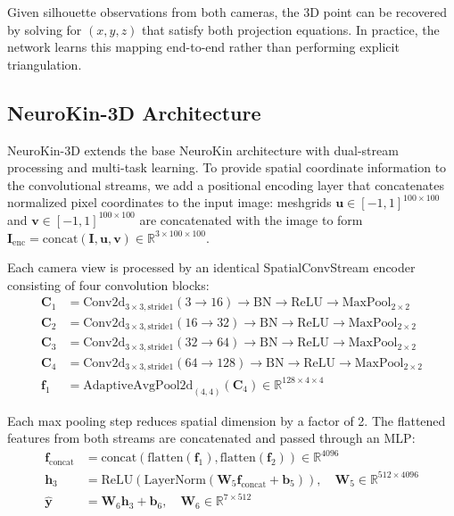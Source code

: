 \documentclass[12pt,a4paper,oneside]{report}
\begin{document}
Given silhouette observations from both cameras, the 3D point can be recovered by solving for $(x, y, z)$ that satisfy both projection equations. In practice, the network learns this mapping end-to-end rather than performing explicit triangulation.
\subsection{NeuroKin-3D Architecture}
\label{subsec:neurokin_3d_architecture}

NeuroKin-3D extends the base NeuroKin architecture with dual-stream processing and multi-task learning. To provide spatial coordinate information to the convolutional streams, we add a positional encoding layer that concatenates normalized pixel coordinates to the input image: meshgrids $\mathbf{u} \in [-1, 1]^{100 \times 100}$ and $\mathbf{v} \in [-1, 1]^{100 \times 100}$ are concatenated with the image to form $\mathbf{I}_{\text{enc}} = \text{concat}(\mathbf{I}, \mathbf{u}, \mathbf{v}) \in \mathbb{R}^{3 \times 100 \times 100}$.

Each camera view is processed by an identical SpatialConvStream encoder consisting of four convolution blocks:
\begin{align}
\mathbf{C}_1 &= \text{Conv2d}_{3\times3,\text{stride}1}(3 \rightarrow 16) \rightarrow \text{BN} \rightarrow \text{ReLU} \rightarrow \text{MaxPool}_{2\times2} \\
\mathbf{C}_2 &= \text{Conv2d}_{3\times3,\text{stride}1}(16 \rightarrow 32) \rightarrow \text{BN} \rightarrow \text{ReLU} \rightarrow \text{MaxPool}_{2\times2} \\
\mathbf{C}_3 &= \text{Conv2d}_{3\times3,\text{stride}1}(32 \rightarrow 64) \rightarrow \text{BN} \rightarrow \text{ReLU} \rightarrow \text{MaxPool}_{2\times2} \\
\mathbf{C}_4 &= \text{Conv2d}_{3\times3,\text{stride}1}(64 \rightarrow 128) \rightarrow \text{BN} \rightarrow \text{ReLU} \rightarrow \text{MaxPool}_{2\times2} \\
\mathbf{f}_1 &= \text{AdaptiveAvgPool2d}_{(4,4)}(\mathbf{C}_4) \in \mathbb{R}^{128 \times 4 \times 4}
\end{align}

Each max pooling step reduces spatial dimension by a factor of 2. The flattened features from both streams are concatenated and passed through an MLP:
\begin{align}
\mathbf{f}_{\text{concat}} &= \text{concat}(\text{flatten}(\mathbf{f}_1), \text{flatten}(\mathbf{f}_2)) \in \mathbb{R}^{4096} \\
\mathbf{h}_3 &= \text{ReLU}(\text{LayerNorm}(\mathbf{W}_5 \mathbf{f}_{\text{concat}} + \mathbf{b}_5)), \quad \mathbf{W}_5 \in \mathbb{R}^{512 \times 4096} \\
\hat{\mathbf{y}} &= \mathbf{W}_6 \mathbf{h}_3 + \mathbf{b}_6, \quad \mathbf{W}_6 \in \mathbb{R}^{7 \times 512}
\end{align}
\end{document}
